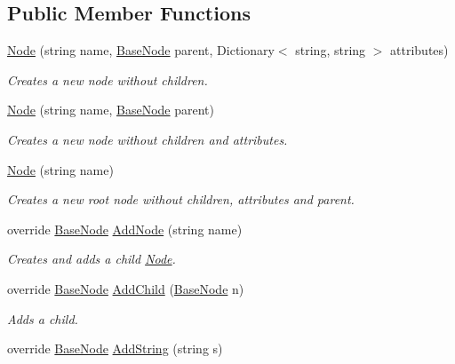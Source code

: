 \subsection*{Public Member Functions}
\begin{DoxyCompactItemize}
\item 
\hyperlink{class_x_m_leru_handleru_1_1_node_af3e096333b8dcc74789ebc04c0984856}{Node} (string name, \hyperlink{class_x_m_leru_handleru_1_1_base_node}{Base\+Node} parent, Dictionary$<$ string, string $>$ attributes)
\begin{DoxyCompactList}\small\item\em Creates a new node without children. \end{DoxyCompactList}\item 
\hyperlink{class_x_m_leru_handleru_1_1_node_a8060ae6840e807ebf3d3ef7f27a468bf}{Node} (string name, \hyperlink{class_x_m_leru_handleru_1_1_base_node}{Base\+Node} parent)
\begin{DoxyCompactList}\small\item\em Creates a new node without children and attributes. \end{DoxyCompactList}\item 
\hyperlink{class_x_m_leru_handleru_1_1_node_ad8005a9ca54062189361e811e7064cff}{Node} (string name)
\begin{DoxyCompactList}\small\item\em Creates a new root node without children, attributes and parent. \end{DoxyCompactList}\item 
override \hyperlink{class_x_m_leru_handleru_1_1_base_node}{Base\+Node} \hyperlink{class_x_m_leru_handleru_1_1_node_aa79ab2740c301fca30270de273d1c796}{Add\+Node} (string name)
\begin{DoxyCompactList}\small\item\em Creates and adds a child \hyperlink{class_x_m_leru_handleru_1_1_node}{Node}. \end{DoxyCompactList}\item 
override \hyperlink{class_x_m_leru_handleru_1_1_base_node}{Base\+Node} \hyperlink{class_x_m_leru_handleru_1_1_node_ad6070ed490bfde070bdb07461fd873e1}{Add\+Child} (\hyperlink{class_x_m_leru_handleru_1_1_base_node}{Base\+Node} n)
\begin{DoxyCompactList}\small\item\em Adds a child. \end{DoxyCompactList}\item 
override \hyperlink{class_x_m_leru_handleru_1_1_base_node}{Base\+Node} \hyperlink{class_x_m_leru_handleru_1_1_node_a74b20c07c1d044392ae7670d58679c90}{Add\+String} (string s)

\end{DoxyCompactItemize}
